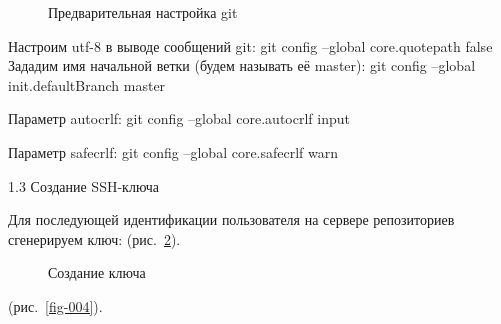 \documentclass[
  english,
  russian,
  12pt,
  a4paper,
  DIV=11,
  numbers=noendperiod]{scrreprt}
\begin{document}
\begin{figure}


\caption{\label{fig-002}Предварительная настройка git}

\end{figure}%

Настроим utf-8 в выводе сообщений git: git config --global
core.quotepath false Зададим имя начальной ветки (будем называть её
master): git config --global init.defaultBranch master

Параметр autocrlf: git config --global core.autocrlf input

Параметр safecrlf: git config --global core.safecrlf warn

1.3 Создание SSH-ключа

Для последующей идентификации пользователя на сервере репозиториев
сгенерируем ключ: (рис.~\ref{fig-003}).

\begin{figure}


\caption{\label{fig-003}Создание ключа}

\end{figure}%

(рис.~\ref{fig-004}).
\end{document}
